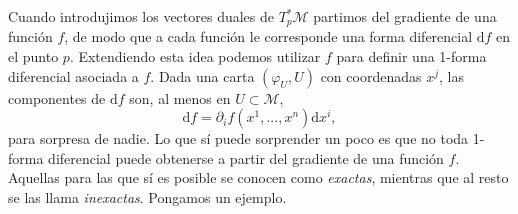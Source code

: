 Cuando introdujimos los vectores duales de \(T_p^*\mathcal{M}\) partimos del gradiente de una función \(f\), de modo que a cada función le corresponde una forma diferencial \(\mathrm{d}f\) en el punto \(p\). Extendiendo esta idea podemos utilizar \(f\) para definir una 1-forma diferencial asociada a \(f\). Dada una carta \((\varphi_U, U)\) con coordenadas \(x^j\), las componentes de \(\mathrm{d}f\) son, al menos en \(U\subset\mathcal{M}\),
\begin{equation*}
    \mathrm{d}f = \partial_i f\left(x^1,...,x^n\right) \mathrm{d}x^i,
\end{equation*}
para sorpresa de nadie. Lo que sí puede sorprender un poco es que no toda 1-forma diferencial puede obtenerse a partir del gradiente de una función \(f\). Aquellas para las que sí es posible se conocen como \emph{exactas}, mientras que al resto se las llama \emph{inexactas}. Pongamos un ejemplo.

